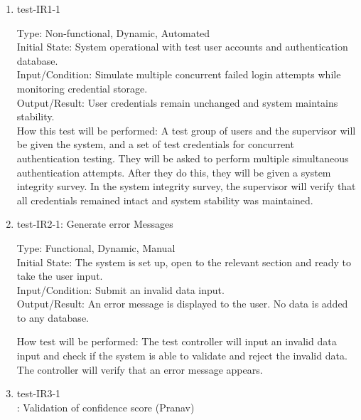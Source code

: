 \documentclass[12pt, titlepage]{article}
\begin{document}
\begin{enumerate}
    \item{test-IR1-1\\}  \label{test-IR1-1}
    
    Type: Non-functional, Dynamic, Automated\\
    
    Initial State: System operational with test user accounts and authentication database.\\
    
    Input/Condition: Simulate multiple concurrent failed login attempts while monitoring credential storage.\\
    
    Output/Result: User credentials remain unchanged and system maintains stability.\\
    
    How this test will be performed: A test group of users and the supervisor will be given the system, and a set of test credentials for concurrent authentication testing. They will be asked to perform multiple simultaneous authentication attempts. After they do this, they will be given a system integrity survey. In the system integrity survey, the supervisor will verify that all credentials remained intact and system stability was maintained.



    \item{test-IR2-1}: Generate error Messages \label{test-IR2-1}
    
    Type: Functional, Dynamic, Manual\\
    
    Initial State: The system is set up, open to the relevant section and ready to take the user input.\\
    
    Input/Condition: Submit an invalid data input.\\
    
    Output/Result: An error message is displayed to the user. No data is added to any database. 
    
    How test will be performed: The test controller will input an invalid data input and check if the system is able to validate and reject the invalid data. The controller will verify that an error message appears.


    \item{test-IR3-1\\}: Validation of confidence score (Pranav) \label{test-IR3-1}
    

\end{enumerate}
\end{document}
